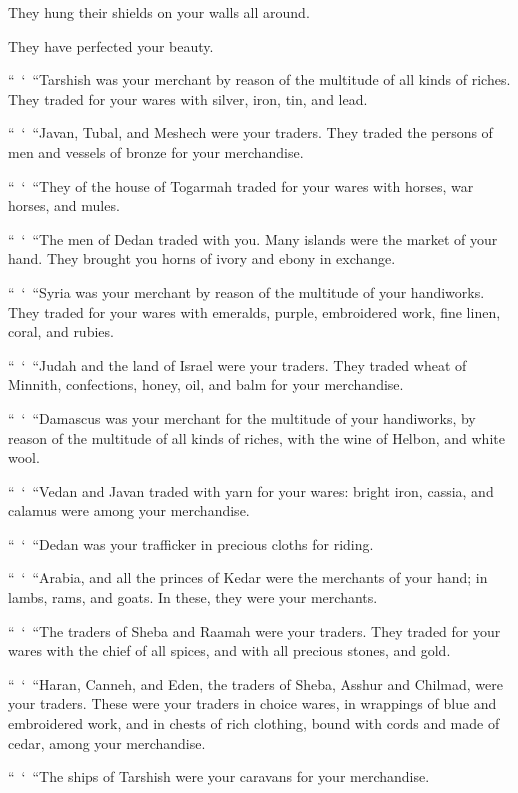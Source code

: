 {\par }{\Q They hung their shields on your walls all around.
\par }{\QB They have perfected your beauty.
\par }{\PP {}“ ‘ “Tarshish was your merchant by reason of the multitude of all kinds of riches. They traded for your wares with silver, iron, tin, and lead.
\par }{\PP {}“ ‘ “Javan, Tubal, and Meshech were your traders. They traded the persons of men and vessels of bronze for your merchandise.
\par }{\PP {}“ ‘ “They of the house of Togarmah traded for your wares with horses, war horses, and mules.
\par }{\PP {}“ ‘ “The men of Dedan traded with you. Many islands were the market of your hand. They brought you horns of ivory and ebony in exchange.
\par }{\PP {}“ ‘ “Syria was your merchant by reason of the multitude of your handiworks. They traded for your wares with emeralds, purple, embroidered work, fine linen, coral, and rubies.
\par }{\PP {}“ ‘ “Judah and the land of Israel were your traders. They traded wheat of Minnith, confections, honey, oil, and balm for your merchandise.
\par }{\PP {}“ ‘ “Damascus was your merchant for the multitude of your handiworks, by reason of the multitude of all kinds of riches, with the wine of Helbon, and white wool.
\par }{\PP {}“ ‘ “Vedan and Javan traded with yarn for your wares: bright iron, cassia, and calamus were among your merchandise.
\par }{\PP {}“ ‘ “Dedan was your trafficker in precious cloths for riding.
\par }{\PP {}“ ‘ “Arabia, and all the princes of Kedar were the merchants of your hand; in lambs, rams, and goats. In these, they were your merchants.
\par }{\PP {}“ ‘ “The traders of Sheba and Raamah were your traders. They traded for your wares with the chief of all spices, and with all precious stones, and gold.
\par }{\PP {}“ ‘ “Haran, Canneh, and Eden, the traders of Sheba, Asshur and Chilmad, were your traders.
These were your traders in choice wares, in wrappings of blue and embroidered work, and in chests of rich clothing, bound with cords and made of cedar, among your merchandise.
\par }{\Q {}“ ‘ “The ships of Tarshish were your caravans for your merchandise.
}
